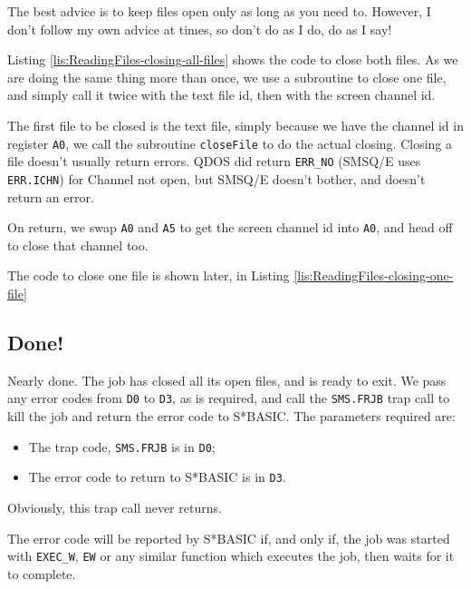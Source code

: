 The best advice is to keep files open only as long as you need to.
However, I don't follow my own advice at times, so don't do as I do,
do as I say! 

Listing \ref{lis:ReadingFiles-closing-all-files} shows the code to
close both files. As we are doing the same thing more than once, we
use a subroutine to close one file, and simply call it twice with
the text file id, then with the screen channel id.



The first file to be closed is the text file, simply because we have
the channel id in register \texttt{A0}, we call the subroutine \texttt{closeFile}
to do the actual closing. Closing a file doesn't usually return errors.
QDOS did return \texttt{ERR\_NO} (SMSQ/E uses \texttt{ERR.ICHN}) for
Channel not open, but SMSQ/E doesn't bother, and doesn't return an
error.

On return, we swap \texttt{A0} and \texttt{A5} to get the screen channel
id into \texttt{A0}, and head off to close that channel too.

The code to close one file is shown later, in Listing \ref{lis:ReadingFiles-closing-one-file}

\subsection{Done!}

Nearly done. The job has closed all its open files, and is ready to
exit. We pass any error codes from \texttt{D0} to \texttt{D3}, as
is required, and call the \texttt{SMS.FRJB} trap call to kill the
job and return the error code to S{*}BASIC. The parameters required
are:
\begin{itemize}
\item The trap code, \texttt{SMS.FRJB} is in \texttt{D0};
\item The error code to return to S{*}BASIC is in \texttt{D3}.
\end{itemize}
Obviously, this trap call never returns.



The error code will be reported by S{*}BASIC if, and only if, the
job was started with \texttt{EXEC\_W}, \texttt{EW} or any similar
function which executes the job, then waits for it to complete.

